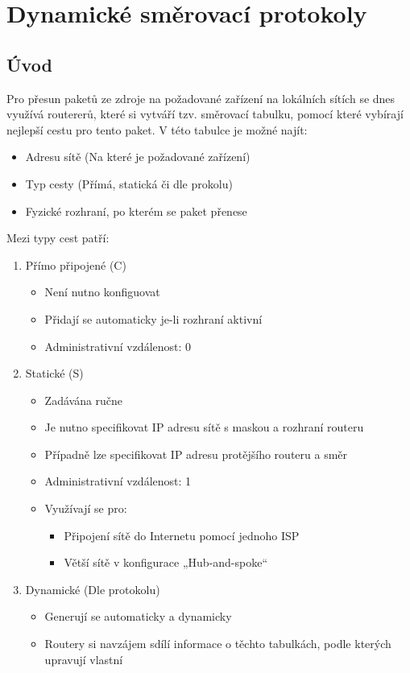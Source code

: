 \section{Dynamické směrovací protokoly}
\label{sec:smerovaci-protokoly}
\subsection{Úvod}
Pro přesun paketů ze zdroje na požadované zařízení na lokálních sítích se dnes využívá routererů, které si vytváří tzv. směrovací tabulku, pomocí které vybírají nejlepší cestu pro tento paket.
V této tabulce je možné najít:
\begin{itemize}
  \item Adresu sítě (Na které je požadované zařízení)
  \item Typ cesty (Přímá, statická či dle prokolu)
  \item Fyzické rozhraní, po kterém se paket přenese
\end{itemize}
Mezi typy cest patří:
\begin{enumerate}
  \item Přímo připojené (C)
        \begin{itemize}
          \item Není nutno konfiguovat
          \item Přidají se automaticky je-li rozhraní aktivní
          \item Administrativní vzdálenost: 0
        \end{itemize}
  \item Statické (S)
        \begin{itemize}
          \item Zadávána ručne
          \item Je nutno specifikovat IP adresu sítě s maskou a rozhraní routeru
          \item Případně lze specifikovat IP adresu protějšího routeru a směr
          \item Administrativní vzdálenost: 1
          \item Využívají se pro:
                \begin{itemize}
                  \item Připojení sítě do Internetu pomocí jednoho ISP
                  \item Větší sítě v konfigurace „Hub-and-spoke“
                \end{itemize}
        \end{itemize}
  \item Dynamické (Dle protokolu)
        \begin{itemize}
          \item Generují se automaticky a dynamicky
          \item Routery si navzájem sdílí informace o těchto tabulkách, podle kterých upravují vlastní
        \end{itemize}
\end{enumerate}

